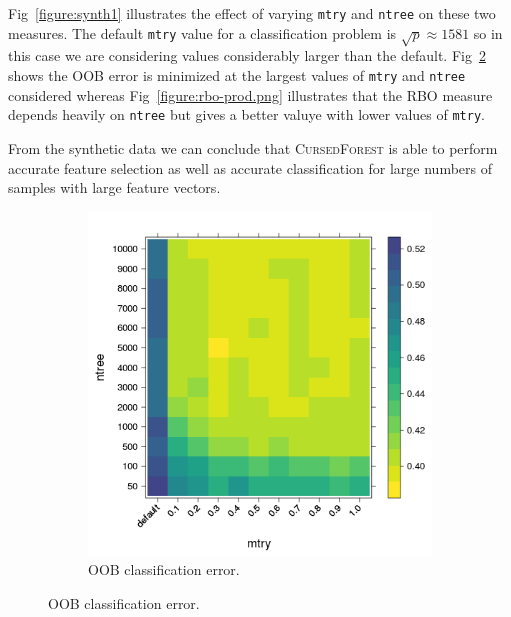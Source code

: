 \documentclass[10pt,letterpaper]{article}
\newcommand{\cursedforest}{\textsc{CursedForest}\xspace}
\newcommand{\mtry}{\texttt{mtry}\xspace}
\newcommand{\ntree}{\texttt{ntree}\xspace}
\begin{document}
Fig~\ref{figure:synth1} illustrates the effect of varying \mtry and \ntree on these two measures. The default \mtry
value for a classification problem is $\sqrt{p} \approx 1581$ so in this case we are considering values considerably larger than
the default. Fig~\ref{figure:out-of-bag-prediction-error-prod.png} shows the OOB error is minimized at the largest
values of \mtry and \ntree considered  whereas Fig~\ref{figure:rbo-prod.png} illustrates that the RBO measure depends
heavily on \ntree but gives a better valuye with lower values of \mtry.

From the synthetic data we can conclude that \cursedforest is able to perform accurate feature selection as well as
accurate classification for large numbers of samples with large feature vectors.


\begin{figure}[tbhp] 
  \begin{adjustwidth}{-1.00in}{0in}
    \caption{\textbf{Out of bag classification error and rank-biased-overlap estimates}} 
    \label{figure:synth1}
    \begin{subfigure}[b]{0.5\linewidth}
      \centering
      \includegraphics[totalheight=8cm]{./figs/oob_levleplot.png}
      \caption{OOB classification error.} 
      \label{figure:out-of-bag-prediction-error-prod.png} 
      \vspace{4ex}
    \end{subfigure} 

\end{adjustwidth}
\end{figure}
\end{document}
